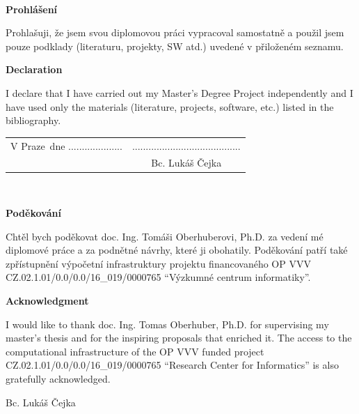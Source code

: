\documentclass[a4paper, twoside, 11pt, czech, american]{book} %
\newcommand{\paperAuthor}{Bc. Lukáš Čejka}   				 %
\newcommand{\place}{Praze} 									 %
\newcommand{\declarationCZ}{Prohlašuji, že jsem svou diplomovou práci vypracoval samostatně a použil jsem pouze podklady (literaturu, projekty, SW atd.) uvedené v přiloženém seznamu.}
\newcommand{\declarationEN}{I declare that I have carried out my Master's Degree Project independently and I have used only the materials (literature, projects, software, etc.) listed in the bibliography.}
\newcommand{\acknowledgementCZ}{Chtěl bych poděkovat doc. Ing. Tomáši Oberhuberovi, Ph.D. za vedení mé diplomové práce a za podnětné návrhy, které ji obohatily. Poděkování patří také zpřístupnění výpočetní infrastruktury projektu financovaného OP VVV CZ.02.1.01/0.0/0.0/16\_019/0000765 ``Výzkumné centrum informatiky''.}
\newcommand{\acknowledgementEN}{I would like to thank doc. Ing. Tomas Oberhuber, Ph.D. for supervising my master's thesis and for the inspiring proposals that enriched it. The access to the computational infrastructure of the OP VVV funded project CZ.02.1.01/0.0/0.0/16\_019/0000765 ``Research Center for Informatics'' is also gratefully acknowledged.}
\begin{document}
~ 					  %
\vfill 				  %

\textbf{Prohlášení}   %

\vspace{1em} 		  %
\declarationCZ

%
\vspace{1em}
\textbf{Declaration}

\vspace{1em}
\declarationEN
{}%

\vspace{2em}  									 							    	%
\hspace{-0.5em}\begin{tabularx}{\textwidth}{X c} 							    	%
	V \place\ dne .................... &........................................ \\ %
	& \paperAuthor
\end{tabularx}




\newpage
\thispagestyle{empty}

~
\vfill %

\textbf{Poděkování}

\vspace{1em} 				%
\acknowledgementCZ

%
\vspace{1em}
\textbf{Acknowledgment}

%
\vspace{1em} 				%
\acknowledgementEN
\begin{flushright}
	\paperAuthor
\end{flushright}  			%




\newpage   			  %
\thispagestyle{empty} %

\newbox\odstavecbox
\newlength\vyskaodstavce
\newcommand\odstavec[2]{%
	\setbox\odstavecbox=\hbox{%
		\parbox[t]{#1}{#2\vrule width 0pt depth 4pt}}%
	\global\vyskaodstavce=\dp\odstavecbox
	\box\odstavecbox}
\newcommand{\delka}{120mm} %
\end{document}
